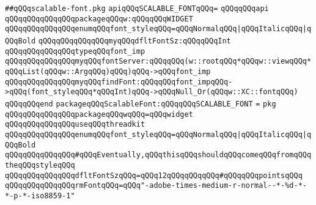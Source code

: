 \label{src/lib/x-kit/widget/old/fancy/2d-graphics/scalable-font.pkg}
\verb|##qQQqscalable-font.pkg|\newline
\newline
\newline
\newline
\verb|apiqQQqSCALABLE_FONTqQQq=|\newline
\verb|qQQqqQQqapi|\newline
\verb|qQQqqQQqqQQqqQQqpackageqQQqw:qQQqqQQqWIDGET|\newline
\newline
\verb|qQQqqQQqqQQqqQQqenumqQQqfont_styleqQQq=qQQqNormalqQQq|\verb#|qQQqItalicqQQq|qQQqBold#\newline
\newline
\verb|qQQqqQQqqQQqqQQqmyqQQqdfltFontSz:qQQqqQQqInt|\newline
\newline
\verb|qQQqqQQqqQQqqQQqtypeqQQqfont_imp|\newline
\newline
\verb|qQQqqQQqqQQqqQQqmyqQQqfontServer:qQQqqQQq(w::rootqQQq*qQQqw::viewqQQq*qQQqList(qQQqw::ArgqQQq)qQQq)qQQq->qQQqfont_imp|\newline
\verb|qQQqqQQqqQQqqQQqmyqQQqfindFont:qQQqqQQqfont_impqQQq->qQQq(font_styleqQQq*qQQqInt)qQQq->qQQqNull_Or(qQQqw::XC::fontqQQq)|\newline
\newline
\verb|qQQqqQQqend|\newline
\newline
\verb|packageqQQqScalableFont:qQQqqQQqSCALABLE_FONT|\newline
\verb|=|\newline
\verb|pkg|\newline
\newline
\verb|qQQqqQQqqQQqqQQqpackageqQQqwqQQq=qQQqwidget|\newline
\newline
\verb|qQQqqQQqqQQqqQQquseqQQqthreadkit|\newline
\newline
\verb|qQQqqQQqqQQqqQQqenumqQQqfont_styleqQQq=qQQqNormalqQQq|\verb#|qQQqItalicqQQq|qQQqBold#\newline
\newline
\verb|qQQqqQQqqQQqqQQq#qQQqEventually,qQQqthisqQQqshouldqQQqcomeqQQqfromqQQqtheqQQqstyleqQQq|\newline
\verb|qQQqqQQqqQQqqQQqdfltFontSzqQQq=qQQq12qQQqqQQqqQQq#qQQqqQQqpointsqQQq|\newline
\verb|qQQqqQQqqQQqqQQqrmFontqQQq=qQQq"-adobe-times-medium-r-normal--*-%d-*-*-p-*-iso8859-1"|\newline
